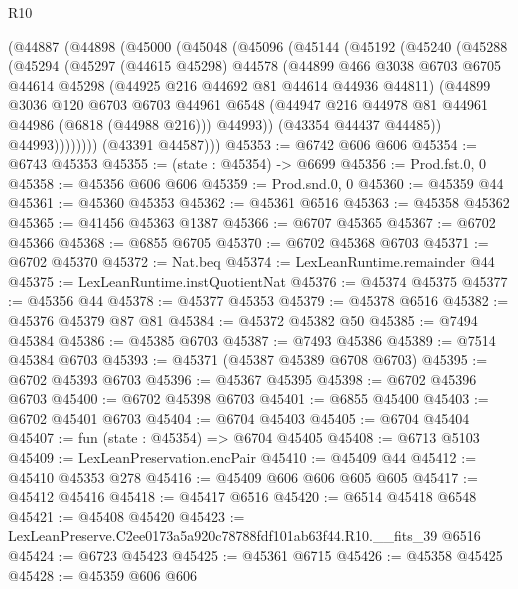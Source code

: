 \begin{lexlean}{R10}
\begin{coremodule}
    (@44887
      (@44898
        (@45000
          (@45048
            (@45096
              (@45144
                (@45192
                  (@45240
                    (@45288
                      (@45294
                        (@45297
                          (@44615 @45298)
                          @44578
                          (@44899
                            @466
                            @3038
                            @6703
                            @6705
                            @44614
                            @45298
                            (@44925 @216 @44692 @81 @44614 @44936 @44811)
                            (@44899
                              @3036
                              @120
                              @6703
                              @6703
                              @44961
                              @6548
                              (@44947 @216 @44978 @81 @44961 @44986 (@6818 (@44988 @216)))
                              @44993))
                          (@43354 @44437 @44485))
                        @44993))))))))
        (@43391 @44587)))
@45353 := @6742 @606 @606
@45354 := @6743 @45353
@45355 := (state : @45354) -> @6699
@45356 := Prod.fst.{0, 0}
@45358 := @45356 @606 @606
@45359 := Prod.snd.{0, 0}
@45360 := @45359 @44
@45361 := @45360 @45353
@45362 := @45361 @6516
@45363 := @45358 @45362
@45365 := @41456 @45363 @1387
@45366 := @6707 @45365
@45367 := @6702 @45366
@45368 := @6855 @6705
@45370 := @6702 @45368 @6703
@45371 := @6702 @45370
@45372 := Nat.beq
@45374 := LexLeanRuntime.remainder @44
@45375 := LexLeanRuntime.instQuotientNat
@45376 := @45374 @45375
@45377 := @45356 @44
@45378 := @45377 @45353
@45379 := @45378 @6516
@45382 := @45376 @45379 @87 @81
@45384 := @45372 @45382 @50
@45385 := @7494 @45384
@45386 := @45385 @6703
@45387 := @7493 @45386
@45389 := @7514 @45384 @6703
@45393 := @45371 (@45387 @45389 @6708 @6703)
@45395 := @6702 @45393 @6703
@45396 := @45367 @45395
@45398 := @6702 @45396 @6703
@45400 := @6702 @45398 @6703
@45401 := @6855 @45400
@45403 := @6702 @45401 @6703
@45404 := @6704 @45403
@45405 := @6704 @45404
@45407 := fun (state : @45354) => @6704 @45405
@45408 := @6713 @5103
@45409 := LexLeanPreservation.encPair
@45410 := @45409 @44
@45412 := @45410 @45353 @278
@45416 := @45409 @606 @606 @605 @605
@45417 := @45412 @45416
@45418 := @45417 @6516
@45420 := @6514 @45418 @6548
@45421 := @45408 @45420
@45423 := LexLeanPreserve.C2ee0173a5a920c78788fdf101ab63f44.R10.__fits_39 @6516
@45424 := @6723 @45423
@45425 := @45361 @6715
@45426 := @45358 @45425
@45428 := @45359 @606 @606

\end{coremodule}
\end{lexlean}
